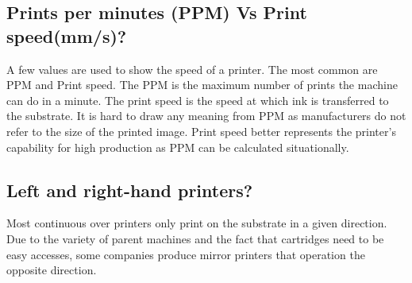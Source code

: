 \subsection{Prints per minutes (PPM) Vs Print speed(mm/s)?}

A few values are used to show the speed of a printer. The most common are PPM and Print speed. The PPM is the maximum number of prints the machine can do in a minute. The print speed is the speed at which ink is transferred to the substrate. It is hard to draw any meaning from PPM  as manufacturers do not refer to the size of the printed image. Print speed better represents the printer's capability for high production as PPM can be calculated situationally.


\subsection{Left and right-hand printers?}

Most continuous over printers only print on the substrate in a given direction. Due to the variety of parent machines and the fact that cartridges need to be easy accesses, some companies produce mirror printers that operation the opposite direction.

